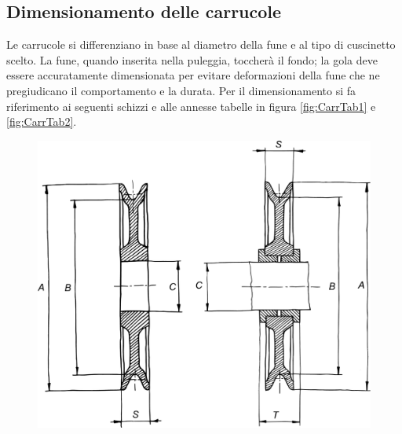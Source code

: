 \subsection{Dimensionamento delle carrucole}
Le carrucole si differenziano in base al diametro della fune e al tipo di cuscinetto scelto. La fune, quando inserita nella puleggia, toccherà il fondo; la gola deve essere accuratamente dimensionata per evitare deformazioni della fune che ne pregiudicano il comportamento e la durata. Per il dimensionamento si fa riferimento ai seguenti schizzi e alle annesse tabelle in figura \ref{fig:CarrTab1} e \ref{fig:CarrTab2}. 
\begin{figure}[H]
\centering
\begin{minipage}{.55\textwidth}
  \centering
  \includegraphics[width=.9\linewidth]{imgs/Carr1}
  \label{fig:Carr1}
\end{minipage}%
\begin{minipage}{.35\textwidth}
  \centering

\end{minipage}
\end{figure}
